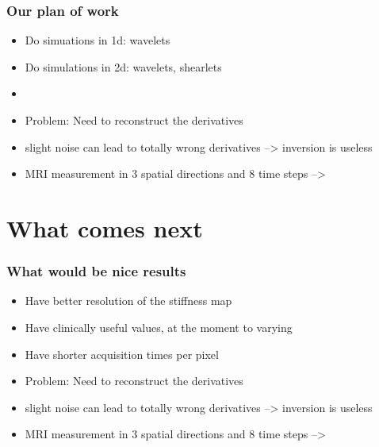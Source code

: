 \begin{frame}		\frametitle{Our plan of work}

\begin{itemize}
 \item Do simuations in 1d: wavelets
 \item Do simulations in 2d: wavelets, shearlets
 \item 
\end{itemize}

\begin{itemize}
 \item Problem: Need to reconstruct the derivatives
 \item slight noise can lead to totally wrong derivatives --> inversion is useless
 \item MRI measurement in 3 spatial directions and 8 time steps --> 
\end{itemize}

\end{frame}

\section{What comes next}


\begin{frame}		\frametitle{What would be nice results}

\begin{itemize}
 \item Have better resolution of the stiffness map
 \item Have clinically useful values, at the moment to varying
 \item Have shorter acquisition times per pixel
\end{itemize}

\begin{itemize}
 \item Problem: Need to reconstruct the derivatives
 \item slight noise can lead to totally wrong derivatives --> inversion is useless
 \item MRI measurement in 3 spatial directions and 8 time steps --> 
\end{itemize}

\end{frame}





 